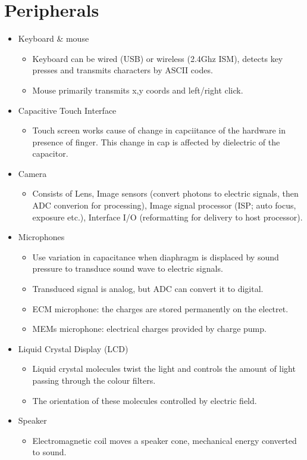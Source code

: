 \documentclass[10pt]{article}
\begin{document}
\section*{Peripherals}


\begin{itemize}
    \item Keyboard \& mouse
    \begin{itemize}
        \item Keyboard can be wired (USB) or wireless (2.4Ghz ISM), detects key presses and transmits characters by ASCII codes.
        \item Mouse primarily transmits x,y coords and left/right click.
    \end{itemize}
    \item Capacitive Touch Interface
    \begin{itemize}
        \item Touch screen works cause of change in capciitance of the hardware in presence of finger.
        This change in cap is affected by dielectric of the capacitor.
    \end{itemize}
    \item Camera
    \begin{itemize}
        \item Consists of Lens, Image sensors (convert photons to electric signals, then ADC converion for processing), Image signal processor (ISP; auto focus, exposure etc.), Interface I/O (reformatting for delivery to host processor). 
    \end{itemize}
    \item Microphones
    \begin{itemize}
        \item Use variation in capacitance when diaphragm is displaced by sound pressure to transduce sound wave to electric signals.
        \item Transduced signal is analog, but ADC can convert it to digital.
        \item ECM microphone: the charges are stored permanently on the electret.
        \item MEMs microphone: electrical charges provided by charge pump.
    \end{itemize}
    \item Liquid Crystal Display (LCD)
    \begin{itemize}
        \item Liquid crystal molecules twist the light and controls the amount of light passing through the colour filters.
        \item The orientation of these molecules controlled by electric field.
    \end{itemize}
    \item Speaker
    \begin{itemize}
        \item Electromagnetic coil moves a speaker cone, mechanical energy converted to sound.
    \end{itemize}
\end{itemize}
\end{document}
